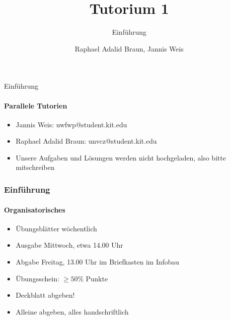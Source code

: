 \documentclass[18pt]{beamer}
\title[Tutorium GBI]{Tutorium 1}
\subtitle{Einführung}
\author{Raphael Adalid Braun, Jannis Weis}
\institute{Grundbegriffe der Informatik | WS 2018/19}
\begin{document}

\begin{frame}
	\titlepage
\end{frame}

\begin{frame}{Einführung}
	\framesubtitle{Parallele Tutorien}
	\begin{itemize}
		\item[]Jannis Weis: uwfwp@student.kit.edu
		\item[]Raphael Adalid Braun: unvcz@student.kit.edu
		\item[]Unsere Aufgaben und Lösungen werden nicht hochgeladen, also bitte mitschreiben
	\end{itemize}
\end{frame}
\begin{frame}
	\frametitle{Einführung}
	\framesubtitle{Organisatorisches}
	\begin{itemize}
		\item Übungsblätter wöchentlich
		\item Ausgabe Mittwoch, etwa 14.00 Uhr
		\item Abgabe Freitag, 13.00 Uhr im Briefkasten im Infobau
		\item Übungsschein: $\geq50\%$ Punkte
		\item Deckblatt abgeben!
		\item Alleine abgeben, alles handschriftlich
	\end{itemize}
\end{frame}
\end{document}
